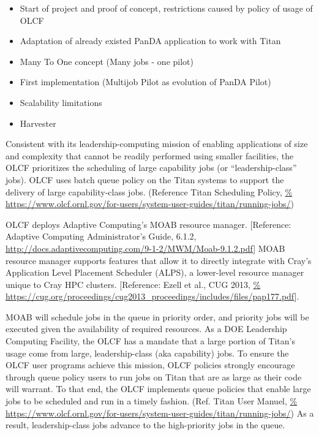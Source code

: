 
%
%

\begin{itemize}
    \item Start of project and proof of concept, restrictions caused by policy
        of usage of OLCF
    \item Adaptation of already existed PanDA application to work with Titan
    \item Many To One concept (Many jobs - one pilot)
    \item First implementation (Multijob Pilot as evolution of PanDA Pilot)
    \item Scalability limitations
    \item Harvester
\end{itemize}

Consistent with its leadership-computing mission of enabling applications of
size and complexity that cannot be readily performed using smaller facilities,
the OLCF prioritizes the scheduling of large capability jobs (or
``leadership-class'' jobs). OLCF uses batch queue policy on the Titan systems
to support the delivery of large capability-class jobs.  (Reference Titan
Scheduling Policy, \url{%
https://www.olcf.ornl.gov/for-users/system-user-guides/titan/running-jobs/})

OLCF deploys Adaptive Computing's MOAB resource manager. [Reference: Adaptive
Computing Administrator’s Guide, 6.1.2,
\url{http://docs.adaptivecomputing.com/9-1-2/MWM/Moab-9.1.2.pdf}]  MOAB
resource manager supports features that allow it to directly integrate with
Cray's Application Level Placement Scheduler (ALPS), a lower-level resource
manager unique to Cray HPC clusters. [Reference: Ezell et al., CUG 2013, \url{%
https://cug.org/proceedings/cug2013_proceedings/includes/files/pap177.pdf}].

MOAB will schedule jobs in the queue in priority order, and priority jobs will
be executed given the availability of required resources.  As a DOE Leadership
Computing Facility, the OLCF has a mandate that a large portion of Titan's
usage come from large, leadership-class (aka capability) jobs. To ensure the
OLCF user programs achieve this mission, OLCF policies strongly encourage
through queue policy users to run jobs on Titan that are as large as their
code will warrant. To that end, the OLCF implements queue policies that enable
large jobs to be scheduled and run in a timely fashion. (Ref. Titan User
Manuel, \url{%
https://www.olcf.ornl.gov/for-users/system-user-guides/titan/running-jobs/})
As a result, leadership-class jobs advance to the high-priority jobs in the
queue.

